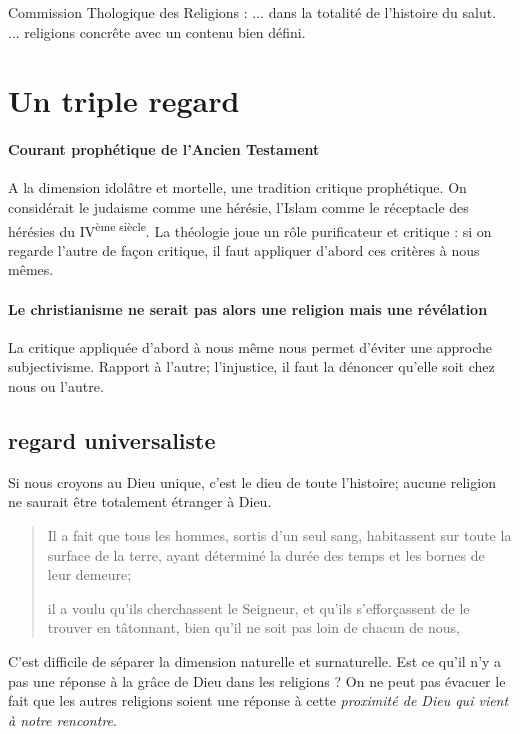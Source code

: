 Commission Thologique des Religions  : ... dans la totalité de l'histoire du salut. ... religions concrête avec un contenu bien défini. 

\section{Un triple regard}

\paragraph{Courant prophétique de l'Ancien Testament} A la dimension idolâtre et mortelle, une tradition critique prophétique.
On considérait le judaisme comme une hérésie, l'Islam comme le réceptacle des hérésies du IV\textsuperscript{ème siècle}. La théologie joue un rôle purificateur et critique : si on regarde l'autre de façon critique, il faut appliquer d'abord ces critères à nous mêmes.

\paragraph{Le christianisme ne serait pas alors une religion mais une révélation}  La critique appliquée d'abord à nous même nous permet d'éviter une approche subjectivisme. Rapport à l'autre; l'injustice, il faut la dénoncer qu'elle soit chez nous ou l'autre.

\subsection{regard universaliste}

Si nous croyons au Dieu unique, c'est le dieu de toute l'histoire; aucune religion ne saurait être totalement étranger à Dieu.
\begin{quote}
    Il a fait que tous les hommes, sortis d'un seul sang, habitassent sur toute la surface de la terre, ayant déterminé la durée des temps et les bornes de leur demeure;

 il a voulu qu'ils cherchassent le Seigneur, et qu'ils s'efforçassent de le trouver en tâtonnant, bien qu'il ne soit pas loin de chacun de nous,
\end{quote}

C'est difficile de séparer la dimension naturelle et surnaturelle. Est ce qu'il n'y a pas une réponse à la grâce de Dieu dans les religions ? On ne peut pas évacuer le fait que les autres religions soient une réponse à cette \textit{proximité de Dieu qui vient à notre rencontre}. 

